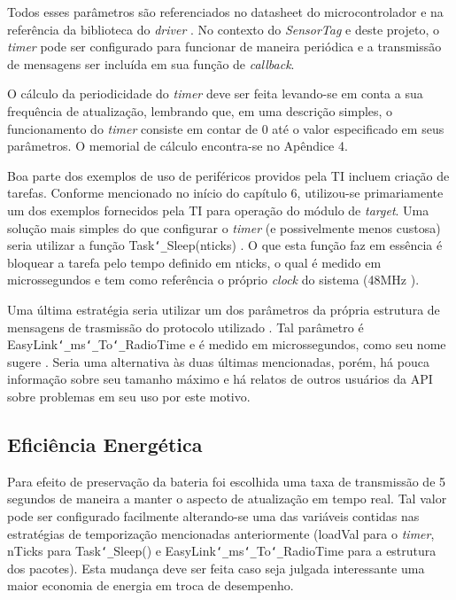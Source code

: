 Todos esses parâmetros são referenciados no datasheet do microcontrolador \cite{datasheet} e na referência da biblioteca do \emph{driver} \cite{gptimer}. No contexto do \emph{SensorTag} e deste projeto, o \emph{timer} pode ser configurado para funcionar de maneira periódica e a transmissão de mensagens ser incluída em sua função de \emph{callback}.

O cálculo da periodicidade do \emph{timer} deve ser feita levando-se em conta a sua frequência de atualização, lembrando que, em uma descrição simples, o funcionamento do \emph{timer} consiste em contar de 0 até o valor especificado em seus parâmetros. O memorial de cálculo encontra-se no Apêndice 4.

Boa parte dos exemplos de uso de periféricos providos pela TI incluem criação de tarefas. Conforme mencionado no início do capítulo 6, utilizou-se primariamente um dos exemplos fornecidos pela TI para operação do módulo de \emph{target}. Uma solução mais simples do que configurar o \emph{timer} (e possivelmente menos custosa) seria utilizar a função Task\texttt{\char`_}Sleep(nticks) \cite{task-modules}. O que esta função faz em essência é bloquear a tarefa pelo tempo definido em nticks, o qual é medido em microssegundos e tem como referência o próprio \emph{clock} do sistema (48MHz \cite{datasheet}).

Uma última estratégia seria utilizar um dos parâmetros da própria estrutura de mensagens de trasmissão do protocolo utilizado \cite{forum-easylink}. Tal parâmetro é EasyLink\texttt{\char`_}ms\texttt{\char`_}To\texttt{\char`_}RadioTime e é medido em microssegundos, como seu nome sugere \cite{easylink}. Seria uma alternativa às duas últimas mencionadas, porém, há pouca informação sobre seu tamanho máximo e há relatos de outros usuários da API sobre problemas em seu uso por este motivo.

\subsection{Eficiência Energética}

Para efeito de preservação da bateria foi escolhida uma taxa de transmissão de 5 segundos de maneira a manter o aspecto de atualização em tempo real. Tal valor pode ser configurado facilmente alterando-se uma das variáveis contidas nas estratégias de temporização mencionadas anteriormente (loadVal para o \emph{timer}, nTicks para Task\texttt{\char`_}Sleep() e EasyLink\texttt{\char`_}ms\texttt{\char`_}To\texttt{\char`_}RadioTime para a estrutura dos pacotes). Esta mudança deve ser feita caso seja julgada interessante uma maior economia de energia em troca de desempenho.

